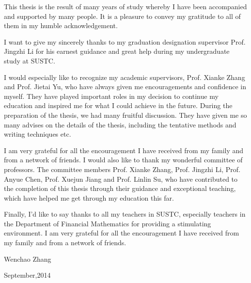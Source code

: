 \begin{thanks}
This thesis is the result of many years of study whereby I have been accompanied and supported by many people. It is a pleasure to convey my gratitude to all of them in my humble acknowledgement.

I want to give my sincerely thanks to my graduation designation supervisor Prof. Jingzhi Li for his earnest guidance and great help during my undergraduate study at SUSTC.

I would especially like to recognize my academic supervisors, Prof. Xianke Zhang and Prof. Jietai Yu, who have always given me encouragements and confidence in myself. They have played important roles in my decision to continue my education and inspired me for what I could achieve in the future. During the preparation of the thesis, we had many fruitful discussion. They have given me so many advises on the details of the thesis, including the tentative methods and writing techniques etc.

I am very grateful for all the encouragement I have received from my family and from a network of friends.  I would also like to thank my wonderful committee of professors. The committee members Prof. Xianke Zhang, Prof. Jingzhi Li, Prof. Anyue Chen, Prof. Xuejun Jiang and Prof. Linlin Su, who have contributed to the completion of this thesis through their guidance and exceptional teaching, which have helped me get through my education this far.  


Finally, I'd like to say thanks to all my teachers in SUSTC, especially teachers in the Department of Financial Mathematics for providing a stimulating environment. I am very grateful for all the encouragement I have received from my family and from a network of friends. 



\vskip 18pt

\begin{flushright}

Wenchao Zhang

September,2014

\end{flushright}

\end{thanks}
